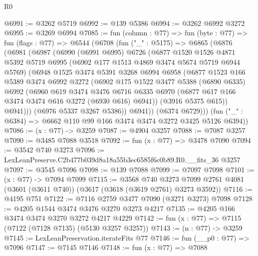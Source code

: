 \begin{lexlean}{R0}
\begin{coremodule}
@6991 := @3262 @5719
@6992 := @139 @5386
@6994 := @3262 @6992 @3272
@6995 := @3269 @6994
@7085 := fun (column : @77) =>
  fun (byte : @77) =>
  fun (flags : @77) =>
  @6544
    (@6708
      (fun ("_" : @5175) =>
      @6865
        (@6876
          (@6981
            (@6987
              (@6990
                (@6991 @6995)
                @6726
                (@6877
                  @1520
                  @1526
                  @4871
                  @5392
                  @5719
                  @6995
                  (@6902 @177 @1513 @4869 @3474 @5674 @5719 @6944 @5769)
                  (@6948
                    @1525
                    @3474
                    @5391
                    @3268
                    @6994
                    @6958
                    (@6877
                      @1523
                      @166
                      @5389
                      @3474
                      @6992
                      @3272
                      (@6902
                        @175
                        @1522
                        @3477
                        @5388
                        (@6890 @6335)
                        @6992
                        (@6960
                          @619
                          @3474
                          @3476
                          @6716
                          @6335
                          @6970
                          (@6877 @617 @166 @3474 @3474 @616 @3272 (@6930 @616) @6941))
                        (@3916 @5375 @615))
                      @6941)))
                (@6976 @5337 @3267 @5386))
              @6941))
          (@6374 @6729)))
      (fun ("_" : @6384) => @6662 @110 @99 @166 @3474 @3474 @3272 @3425 @5126 @6394))
@7086 := (x : @77) -> @3259
@7087 := @4904 @3257
@7088 := @7087 @3257
@7090 := @3485 @7088 @3518
@7092 := fun (x : @77) => @3478 @7090
@7094 := @3542 @740 @3273
@7096 := LexLeanPreserve.C2b477b039d8a18a55b3ec6585f6c0b89.R0.__fits_36 @3257
@7097 := @3545 @7096
@7098 := @139 @7088
@7099 := @7097 @7098
@7101 := (x : @77) -> @7094 @7099
@7115 := @3568
    @740
    @3273
    @7099
    @2761
    @4081
    (@3601 (@3611 @740))
    (@3617 (@3618 (@3619 @2761) @3273 @3592))
@7116 := @4195 @751
@7122 := @7116 @2759 @3477 @7090 (@3271 @3273) @7098
@7128 := @4205 @1544 @3474 @3476 @3270 @3273 @4217
@7135 := @4205 @166 @3474 @3474 @3270 @3272 @4217 @4229
@7142 := fun (x : @77) => @7115 (@7122 (@7128 @7135) (@5130 @3257 @3257))
@7143 := (n : @77) -> @3259
@7145 := LexLeanPreservation.iterateFits @77
@7146 := fun (__p0 : @77) => @7096
@7147 := @7145 @7146
@7148 := fun (x : @77) => @7088

\end{coremodule}
\end{lexlean}
